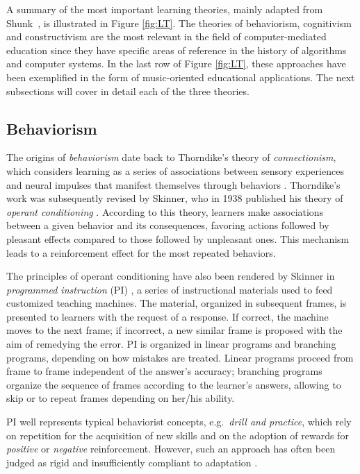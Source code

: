 \documentclass[10pt,journal,compsoc]{IEEEtran}
\begin{document}
A summary of the most important learning theories, mainly adapted from Shunk~\cite{dale1991learning}, is illustrated in Figure \ref{fig:LT}. The theories of behaviorism, cognitivism and constructivism are the most relevant in the field of computer-mediated education since they have specific areas of reference in the history of algorithms and computer systems. In the last row of Figure \ref{fig:LT}, these approaches have been exemplified in the form of music-oriented educational applications. The next subsections will cover in detail each of the three theories.

\subsection{Behaviorism}
\label{subsec:beh}
The origins of \textit{behaviorism} date back to Thorndike's theory of \textit{connectionism}, which considers learning as a series of associations between sensory experiences and neural impulses that manifest themselves through behaviors \cite{thorndike1913}. Thorndike's work was subsequently revised by Skinner, who in 1938 published his theory of \textit{operant conditioning} \cite{skinner1990behavior}. According to this theory, learners make associations between a given behavior and its consequences, favoring actions followed by pleasant effects compared to those followed by unpleasant ones. This mechanism leads to a reinforcement effect for the most repeated behaviors. 

The principles of operant conditioning have also been rendered by Skinner in \textit{programmed instruction} (PI) \cite{skinner1958teaching}, a series of instructional materials used to feed customized teaching machines. The material, organized in subsequent frames, is presented to learners with the request of a response. If correct, the machine moves to the next frame; if incorrect, a new similar frame is proposed with the aim of remedying the error. PI is organized in linear programs and branching programs, depending on how mistakes are treated. Linear programs proceed from frame to frame independent of the answer's accuracy; branching programs organize the sequence of frames according to the learner's answers, allowing to skip or to repeat frames depending on her/his ability. 

PI well represents typical behaviorist concepts, e.g.\ \textit{drill and practice}, which rely on repetition for the acquisition of new skills and on the adoption of rewards for \textit{positive} or \textit{negative} reinforcement. However, such an approach has often been judged as rigid and insufficiently compliant to adaptation \cite{mcdonald2005learning}. 
\end{document}
